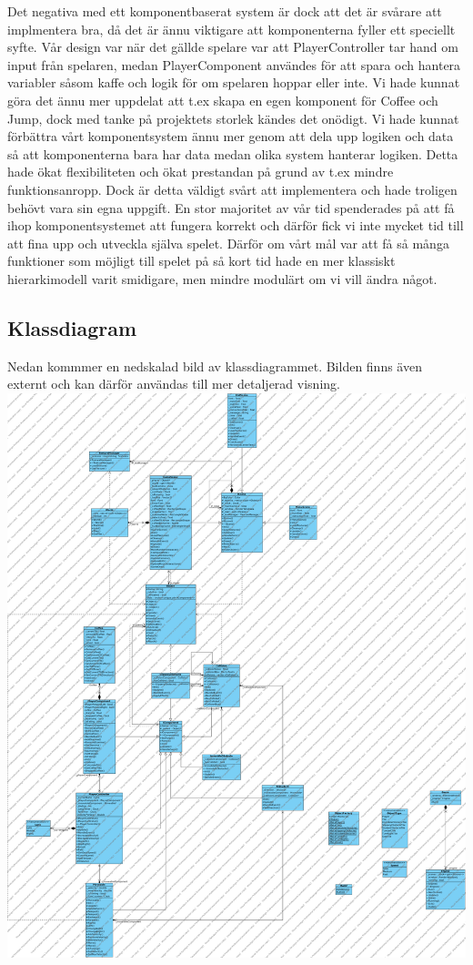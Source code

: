 \documentclass{template}
\begin{document}
Det negativa med ett komponentbaserat system är dock att det är svårare att implmentera bra, då det är ännu viktigare att komponenterna fyller ett speciellt syfte. Vår design var när det gällde spelare var att PlayerController tar hand om input från spelaren, medan PlayerComponent användes för att spara och hantera variabler såsom kaffe och logik för om spelaren hoppar eller inte. Vi hade kunnat göra det ännu mer uppdelat att t.ex skapa en egen komponent för Coffee och Jump, dock med tanke på projektets storlek kändes det onödigt. Vi hade kunnat förbättra vårt komponentsystem ännu mer genom att dela upp logiken och data så att komponenterna bara har data medan olika system hanterar logiken. Detta hade ökat flexibiliteten och ökat prestandan på grund av t.ex mindre funktionsanropp. Dock är detta väldigt svårt att implementera och hade troligen behövt vara sin egna uppgift. En stor majoritet av vår tid spenderades på att få ihop komponentsystemet att fungera korrekt och därför fick vi inte mycket tid till att fina upp och utveckla själva spelet. Därför om vårt mål var att få så många funktioner som möjligt till spelet på så kort tid hade en mer klassiskt hierarkimodell varit smidigare, men mindre modulärt om vi vill ändra något.

\subsection{Klassdiagram}
Nedan kommmer en nedskalad bild av klassdiagrammet. Bilden finns även externt och kan därför användas till mer detaljerad visning. \\
\includegraphics[width=40em]{klassdiagram1.png}
\newpage
\end{document}

